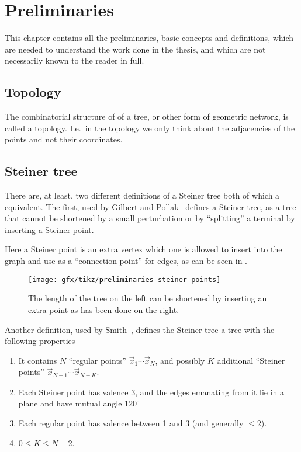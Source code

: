 {
\abnormalparskip{0pt}
\chapter{Preliminaries}
\label{cha:preliminaries}
}

This chapter contains all the preliminaries, basic concepts and definitions,
which are needed to understand the work done in the thesis, and which are
not necessarily known to the reader in full.


\section{Topology}
\label{sec:topology}

The combinatorial structure of of a tree, or other form of geometric network, is
called a topology. I.e.\ in the topology we only think about the adjacencies of
the points and not their coordinates.

\section{Steiner tree}
\label{sec:steiner-tree}

There are, at least, two different definitions of a Steiner tree both of which a
equivalent. The first, used by Gilbert and Pollak~\cite{Gilbert1968} defines a
Steiner tree, as a tree that cannot be shortened by a small perturbation or by
``splitting'' a terminal by inserting a Steiner point.

Here a Steiner point is an extra vertex which one is allowed to insert into the
graph and use as a ``connection point'' for edges, as can be seen in
.

\begin{figure}[htbp]
\centering
\texttt{[image: gfx/tikz/preliminaries-steiner-points]}
\caption[Steiner point of isosceles triangle.]{The length of the tree on the left
  can be shortened by inserting an extra point as has been done on the
  right.\label{fig:preliminaries-steiner-point}}
\end{figure}

Another definition, used by Smith~\cite{Smith1992}, defines the Steiner tree a
tree with the following properties

\begin{enumerate}
\item It contains $N$ ``regular points'' $\vec{x}_1 \cdots \vec{x}_N$, and
  possibly $K$ additional ``Steiner points'' $\vec{x}_{N+1} \cdots
  \vec{x}_{N+K}$.
\item Each Steiner point has valence 3, and the edges emanating from it lie in a
  plane and have mutual angle $120^{\circ}$
\item Each regular point has valence between 1 and 3 (and generally $\le 2$).
\item $0 \le K \le N-2$.
\end{enumerate}

